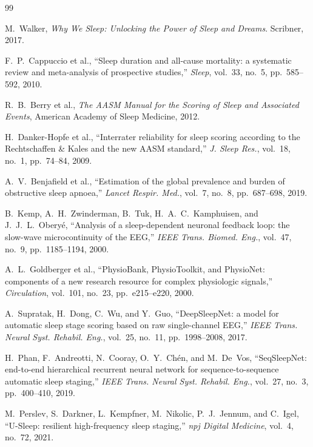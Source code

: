 \documentclass[10pt]{article}
\begin{document}
\newpage
\begin{thebibliography}{99}

M.~Walker, \textit{Why We Sleep: Unlocking the Power of Sleep and Dreams}. Scribner, 2017.

F.~P.~Cappuccio et al., ``Sleep duration and all-cause mortality: a systematic review and meta-analysis of prospective studies,'' \textit{Sleep}, vol.~33, no.~5, pp.~585--592, 2010.

R.~B.~Berry et al., \textit{The AASM Manual for the Scoring of Sleep and Associated Events}, American Academy of Sleep Medicine, 2012.

H.~Danker-Hopfe et al., ``Interrater reliability for sleep scoring according to the Rechtschaffen \& Kales and the new AASM standard,'' \textit{J. Sleep Res.}, vol.~18, no.~1, pp.~74--84, 2009.

A.~V.~Benjafield et al., ``Estimation of the global prevalence and burden of obstructive sleep apnoea,'' \textit{Lancet Respir. Med.}, vol.~7, no.~8, pp.~687--698, 2019.

B.~Kemp, A.~H.~Zwinderman, B.~Tuk, H.~A.~C.~Kamphuisen, and J.~J.~L.~Obery{\'e}, ``Analysis of a sleep-dependent neuronal feedback loop: the slow-wave microcontinuity of the EEG,'' \textit{IEEE Trans. Biomed. Eng.}, vol.~47, no.~9, pp.~1185--1194, 2000.

A.~L.~Goldberger et al., ``PhysioBank, PhysioToolkit, and PhysioNet: components of a new research resource for complex physiologic signals,'' \textit{Circulation}, vol.~101, no.~23, pp.~e215--e220, 2000.

A.~Supratak, H.~Dong, C.~Wu, and Y.~Guo, ``DeepSleepNet: a model for automatic sleep stage scoring based on raw single-channel EEG,'' \textit{IEEE Trans. Neural Syst. Rehabil. Eng.}, vol.~25, no.~11, pp.~1998--2008, 2017.

H.~Phan, F.~Andreotti, N.~Cooray, O.~Y.~Ch{\'e}n, and M.~De~Vos, ``SeqSleepNet: end-to-end hierarchical recurrent neural network for sequence-to-sequence automatic sleep staging,'' \textit{IEEE Trans. Neural Syst. Rehabil. Eng.}, vol.~27, no.~3, pp.~400--410, 2019.

M.~Perslev, S.~Darkner, L.~Kempfner, M.~Nikolic, P.~J.~Jennum, and C.~Igel, ``U-Sleep: resilient high-frequency sleep staging,'' \textit{npj Digital Medicine}, vol.~4, no.~72, 2021.


\end{thebibliography}
\end{document}
